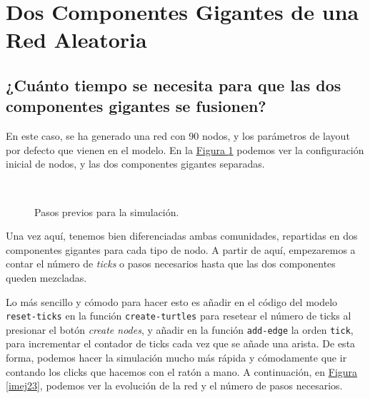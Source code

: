 \documentclass[paper=a4, fontsize=11pt]{article} %
\numberwithin{equation}{section} %
\numberwithin{figure}{section} %
\numberwithin{table}{section} %
\begin{document}
\section{Dos Componentes Gigantes de una Red Aleatoria}

\subsection{¿Cuánto tiempo se necesita para que las dos componentes gigantes se fusionen?}

En este caso, se ha generado una red con 90 nodos, y los parámetros de layout por defecto que vienen en el modelo. En la \hyperref[imej2]{Figura \ref{imej2}} podemos ver la configuración inicial de nodos, y las dos componentes gigantes separadas.

\begin{figure}[H]
    \centering
    \mbox{
        \qquad
    }
    \caption{Pasos previos para la simulación.}
    \label{imej2}
\end{figure}

Una vez aquí, tenemos bien diferenciadas ambas comunidades, repartidas en dos componentes gigantes para cada tipo de nodo. A partir de aquí, empezaremos a contar el número de \textit{ticks} o pasos necesarios hasta que las dos componentes queden mezcladas.

Lo más sencillo y cómodo para hacer esto es añadir en el código del modelo \texttt{reset-ticks} en la función \texttt{create-turtles} para resetear el número de ticks al presionar el botón \textit{create nodes}, y añadir en la función \texttt{add-edge} la orden \texttt{tick}, para incrementar el contador de ticks cada vez que se añade una arista. De esta forma, podemos hacer la simulación mucho más rápida y cómodamente que ir contando los clicks que hacemos con el ratón a mano. A continuación, en \hyperref[imej23]{Figura \ref{imej23}}, podemos ver la evolución de la red y el número de pasos necesarios.
\end{document}
